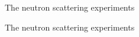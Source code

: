 \documentclass[1pt]{beamer}
\begin{document}
\begin{frame}{The neutron scattering experiments}
\end{frame}
\begin{frame}{The neutron scattering experiments}

\end{frame}
\end{document}
